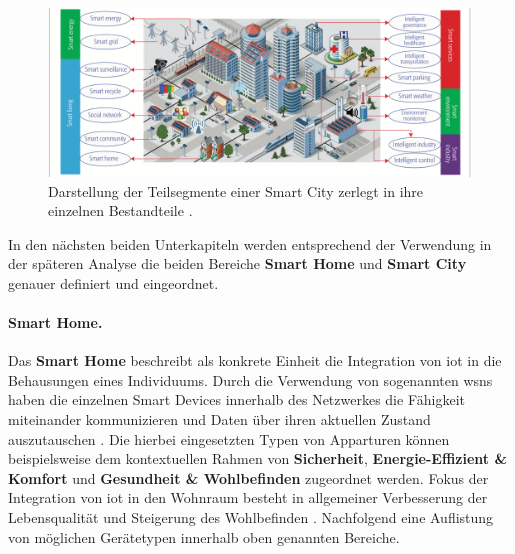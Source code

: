 \begin{figure}
    \includegraphics[width=\textwidth]{fundamentals/pictures/Smart_Applications}
    \caption{Darstellung der Teilsegmente einer Smart City zerlegt in ihre einzelnen Bestandteile \cite{Zhang2017}.}
    \label{fig:smart-applications}
\end{figure}

\noindent In den nächsten beiden Unterkapiteln werden entsprechend der Verwendung in der späteren Analyse die beiden Bereiche \textbf{Smart Home} und \textbf{Smart City} genauer definiert und eingeordnet.

\paragraph{Smart Home.}
\label{sec:Grundlagen:para:Smart Home}
Das \textbf{Smart Home} beschreibt als konkrete Einheit die Integration von \ac{iot} in die Behausungen eines Individuums. Durch die Verwendung von sogenannten \aclp{wsn} haben die einzelnen Smart Devices innerhalb des Netzwerkes die Fähigkeit miteinander kommunizieren und Daten über ihren aktuellen Zustand auszutauschen \cite{Biljana2017}. Die hierbei eingesetzten Typen von Apparturen können beispielsweise dem kontextuellen Rahmen von \textbf{Sicherheit}, \textbf{Energie-Effizient \& Komfort} und \textbf{Gesundheit \& Wohlbefinden} zugeordnet werden. Fokus der Integration von \ac{iot} in den Wohnraum besteht in allgemeiner Verbesserung der Lebensqualität und Steigerung des Wohlbefinden \cite{Bastos2018}. Nachfolgend eine Auflistung von möglichen Gerätetypen innerhalb oben genannten Bereiche.

